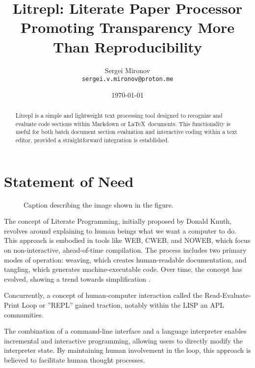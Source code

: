 \documentclass[a4paper,12pt,twocolumn]{article}
\title{Litrepl: Literate Paper Processor Promoting Transparency More Than Reproducibility}
\author{Sergei Mironov \\
        \texttt{sergei.v.mironov@proton.me}}
\date{\today}
\newcommand{\Latex}{\LaTeX\ }
\begin{document}
\maketitle

\begin{abstract}

Litrepl is a simple and lightweight text processing tool designed to recognize
and evaluate code sections within Markdown or \Latex documents. This
functionality is useful for both batch document section evaluation and
interactive coding within a text editor, provided a straightforward integration
is established.

\end{abstract}

\section{Statement of Need}

\begin{figure*}[!hbt]
  \centering
  
  \caption{Caption describing the image shown in the figure.}
  \label{fig:resource-allocation}
\end{figure*}

The concept of Literate Programming, initially proposed by Donald Knuth,
revolves around explaining to human beings what we want a computer to do. This
approach is embodied in tools like WEB, CWEB, and NOWEB, which focus on
non-interactive, ahead-of-time compilation. The process includes two primary
modes of operation: weaving, which creates human-readable documentation, and
tangling, which generates machine-executable code. Over time, the concept has
evolved, showing a trend towards simplification \cite{Knuth1984lp,
Ramsey1994lps}.

Concurrently, a concept of human-computer interaction called the
Read-Evaluate-Print Loop or ''REPL'' gained traction, notably within the LISP
an APL communities.\cite{Spence1975apl, McCarthy1959recfun, Iverson1962apl}

The combination of a command-line interface and a language interpreter enables
incremental and interactive programming, allowing users to directly modify the
interpreter state. By maintaining human involvement in the loop, this approach
is believed to facilitate human thought processes.
\end{document}
